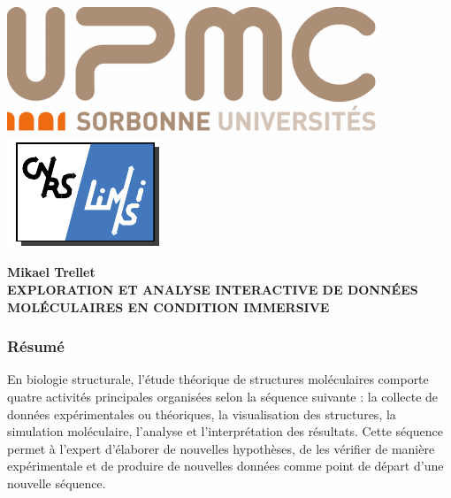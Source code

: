 \backmatter 
\chapter*{}%
\pagestyle{empty}

\setlength{\headheight}{0.pt}
        
\includegraphics[height=1.cm]{./figures/UPMC_these.pdf}\hfill
\includegraphics[height=1.cm]{./figures/limsilogo_vectoriel.pdf}\hfill


\begin{center}
 \textbf{Mikael Trellet} \\
 \textbf{EXPLORATION ET ANALYSE INTERACTIVE DE DONNÉES MOLÉCULAIRES EN CONDITION IMMERSIVE}
\end{center}
    

\footnotesize
\subsection*{Résumé}












\footnotesize
En biologie structurale, l'étude théorique de structures moléculaires comporte quatre activités principales organisées selon la séquence suivante : la collecte de données expérimentales ou théoriques, la visualisation des structures, la simulation moléculaire, l'analyse et l'interprétation des résultats. Cette séquence permet à l'expert d'élaborer de nouvelles hypothèses, de les vérifier de manière expérimentale et de produire de nouvelles données comme point de départ d'une nouvelle séquence.

